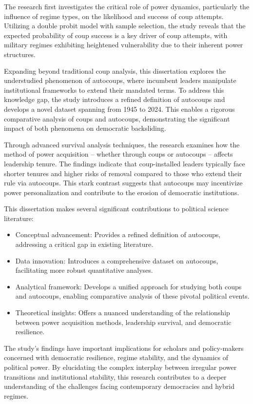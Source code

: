 \documentclass[
  12pt,
]{report}
\begin{document}
The research first investigates the critical role of power dynamics,
particularly the influence of regime types, on the likelihood and
success of coup attempts. Utilizing a double probit model with sample
selection, the study reveals that the expected probability of coup
success is a key driver of coup attempts, with military regimes
exhibiting heightened vulnerability due to their inherent power
structures.

Expanding beyond traditional coup analysis, this dissertation explores
the understudied phenomenon of autocoups, where incumbent leaders
manipulate institutional frameworks to extend their mandated terms. To
address this knowledge gap, the study introduces a refined definition of
autocoups and develops a novel dataset spanning from 1945 to 2024. This
enables a rigorous comparative analysis of coups and autocoups,
demonstrating the significant impact of both phenomena on democratic
backsliding.

Through advanced survival analysis techniques, the research examines how
the method of power acquisition -- whether through coups or autocoups --
affects leadership tenure. The findings indicate that coup-installed
leaders typically face shorter tenures and higher risks of removal
compared to those who extend their rule via autocoups. This stark
contrast suggests that autocoups may incentivize power personalization
and contribute to the erosion of democratic institutions.

This dissertation makes several significant contributions to political
science literature:

\begin{itemize}
\item
  Conceptual advancement: Provides a refined definition of autocoups,
  addressing a critical gap in existing literature.
\item
  Data innovation: Introduces a comprehensive dataset on autocoups,
  facilitating more robust quantitative analyses.
\item
  Analytical framework: Develops a unified approach for studying both
  coups and autocoups, enabling comparative analysis of these pivotal
  political events.
\item
  Theoretical insights: Offers a nuanced understanding of the
  relationship between power acquisition methods, leadership survival,
  and democratic resilience.
\end{itemize}

The study's findings have important implications for scholars and
policy-makers concerned with democratic resilience, regime stability,
and the dynamics of political power. By elucidating the complex
interplay between irregular power transitions and institutional
stability, this research contributes to a deeper understanding of the
challenges facing contemporary democracies and hybrid regimes.
\end{document}
